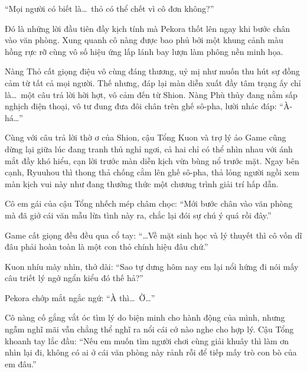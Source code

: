 \documentclass[../main.tex]{subfiles}
\begin{document}

``Mọi người có biết là\dots\ thỏ có thể chết vì cô đơn không?''

Đó là những lời đầu tiên đầy kịch tính mà Pekora thốt lên ngay khi bước chân vào văn phòng. Xung quanh cô nàng được bao phủ bởi một khung cảnh màu hồng rực rỡ cùng vô số hiệu ứng lấp lánh bay lượn làm phông nền minh họa.


Nàng Thỏ cất giọng điệu vô cùng đáng thương, uỷ mị như muốn thu hút sự đồng cảm từ tất cả mọi người. Thế nhưng, đáp lại màn diễn xuất đầy tâm trạng ấy chỉ là\dots\ một câu trả lời hời hợt, vô cảm đến từ Shion. Nàng Phù thủy đang nằm sấp nghịch điện thoại, vô tư đung đưa đôi chân trên ghế sô-pha, lười nhác đáp: ``À-há\dots''


Cùng với câu trả lời thờ ơ của Shion, cậu Tổng Kuon và trợ lý ảo Game cũng dừng lại giữa lúc đang tranh thủ nghỉ ngơi, cả hai chỉ có thể nhìn nhau với ánh mắt đầy khó hiểu, cạn lời trước màn diễn kịch vừa bùng nổ trước mặt. Ngay bên cạnh, Ryuuhou thì thong thả chống cằm lên ghế sô-pha, thả lỏng người ngồi xem màn kịch vui này như đang thưởng thức một chương trình giải trí hấp dẫn.

Cô em gái của cậu Tổng nhếch mép châm chọc: ``Mới bước chân vào văn phòng mà đã giở cái văn mẫu lừa tình này ra, chắc lại đói sự chú ý quá rồi đây.''

Game cất giọng đều đều qua cổ tay: ``\dots Về mặt sinh học và lý thuyết thì cô vốn dĩ đâu phải hoàn toàn là một con thỏ chính hiệu đâu chứ.''

Kuon nhíu mày nhìn, thở dài: ``Sao tự dưng hôm nay em lại nổi hứng đi nói mấy câu triết lý ngớ ngẩn kiểu đó thế hả?''

Pekora chớp mắt ngắc ngứ: ``À thì\dots\ Ờ\dots''

Cô nàng cố gắng vắt óc tìm lý do biện minh cho hành động của mình, nhưng ngẫm nghĩ mãi vẫn chẳng thể nghĩ ra nổi cái cớ nào nghe cho hợp lý. Cậu Tổng khoanh tay lắc đầu: ``Nếu em muốn tìm người chơi cùng giải khuây thì làm ơn nhìn lại đi, không có ai ở cái văn phòng này rảnh rỗi để tiếp mấy trò con bò của em đâu.''
\end{document}
